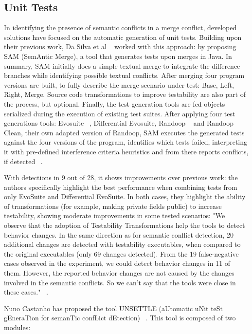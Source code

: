 \subsection{Unit Tests}

In identifying the presence of semantic conflicts in a merge conflict, developed solutions have focused on the automatic generation of unit tests. Building upon their previous work, Da Silva et al ~\citep{kn:leuson2} worked with this approach: by proposing SAM (SemAntic Merge), a tool that generates tests upon merges in Java. In summary, SAM initially does a simple textual merge to integrate the difference branches while identifying possible textual conflicts. After merging four program versions are built, to fully describe the merge scenario under test: Base, Left, Right, Merge. Source code transformations to improve testability are also part of the process, but optional. Finally, the test generation tools are fed objects serialized during the execution of existing test suites. After applying four test generations tools: Evosuite ~\citep{kn:evosuite}, Differential Evosuite, Randoop ~\citep{kn:randoop} and Randoop Clean, their own adapted version of Randoop, SAM executes the generated tests against the four versions of the program, identifies which tests failed, interpreting it with pre-defined interference criteria heuristics and from there reports conflicts, if detected ~\citep{kn:leuson2}.

With detections in 9 out of 28, it shows improvements over previous work: the authors specifically highlight the best performance when combining tests from only EvoSuite and Differential EvoSuite. In both cases, they highlight the ability of transformations (for example, making private fields public) to increase testability, showing moderate improvements in some tested scenarios: "We observe that the adoption of Testability Transformations help the tools
to detect behavior changes. In the same direction as for semantic conflict
detection, 20 additional changes are detected with testability executables,
when compared to the original executables (only 69 changes detected). From
the 19 false-negative cases observed in the experiment, we could detect
behavior changes in 11 of them. However, the reported behavior changes are
not caused by the changes involved in the semantic conflicts. So we can’t say
that the tools were close in these cases."  ~\citep{kn:leuson2}.


Nuno Castanho has proposed the tool UNSETTLE (aUtomatic uNit teSt gEneraTion for semanTic confLict dEtection) ~\citep{kn:nuno}. This tool is composed of two modules:

